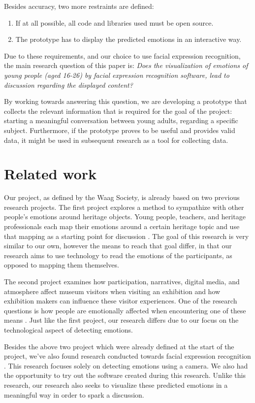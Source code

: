 \documentclass[sigconf]{acmart}
\begin{document}
Besides accuracy, two more restraints are defined:
\begin{enumerate}
    \item{If at all possible, all code and libraries used must be open source.}
    \item{The prototype has to display the predicted emotions in an interactive way.}
\end{enumerate}
Due to these requirements, and our choice to use facial expression recognition, the main research question
of this paper is: \emph{Does the visualization of emotions of young people (aged 16-26) by facial expression
recognition software, lead to discussion regarding the displayed content?}

By working towards answering this question, we are developing a prototype that collects the relevant information
that is required for the goal of the project: starting a meaningful conversation between young adults, regarding
a specific subject. Furthermore, if the prototype proves to be useful and provides valid data, it might be used in subsequent
research as a tool for collecting data.


\section{Related work}
Our project, as defined by the Waag Society, is already based on two previous research projects. The first
project explores a method to sympathize with other people's emotions around heritage objects. Young people,
teachers, and heritage professionals each map their emotions around a certain heritage topic and use that
mapping as a starting point for discussion \cite{emotionnetworking2017}. The goal of this research is very
similar to our own, however the means to reach that goal differ, in that our research aims to use technology
to read the emotions of the participants, as opposed to mapping them themselves.

The second project examines how participation, narratives, digital media, and atmosphere affect museum
visitors when visiting an exhibition and how exhibition makers can influence these visitor experiences.
One of the research questions is how people are emotionally affected when encountering one of
these means \cite{}. Just like the first project, our research differs due to our focus on the technological
aspect of detecting emotions.

Besides the above two project which were already defined at the start of the project, we've also found research
conducted towards facial expression recognition \cite{den2005facereader}. This research focuses solely on
detecting emotions using a camera. We also had the opportunity to try out the software created during this
research. Unlike this research, our research also seeks to visualize these predicted emotions in a meaningful
way in order to spark a discussion.
\end{document}
